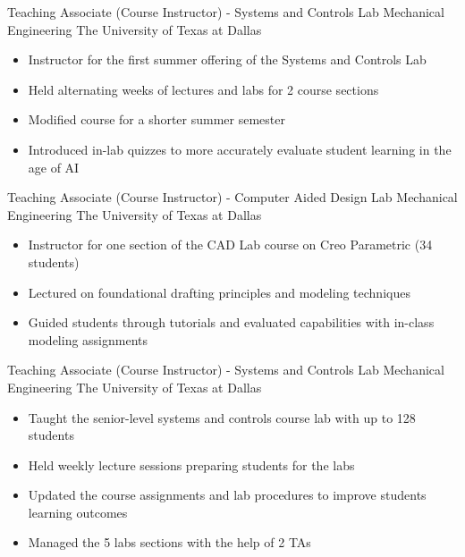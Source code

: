 \documentclass[11pt,letterpaper,roman]{moderncv} %
\begin{document}
{Teaching Associate (Course Instructor) - Systems and Controls Lab}
{Mechanical Engineering}
{The University of Texas at Dallas}{}
{\begin{itemize}
    \item Instructor for the first summer offering of the Systems and Controls Lab
    \item Held alternating weeks of lectures and labs for 2 course sections
    \item Modified course for a shorter summer semester 
    \item Introduced in-lab quizzes to more accurately evaluate student learning in the age of AI
\end{itemize}}

{Teaching Associate (Course Instructor) - Computer Aided Design Lab}
{Mechanical Engineering}
{The University of Texas at Dallas}{}
{\begin{itemize}
    \item Instructor for one section of the CAD Lab course on Creo Parametric (34 students)
    \item Lectured on foundational drafting principles and modeling techniques
    \item Guided students through tutorials and evaluated capabilities with in-class modeling assignments
\end{itemize}}

{Teaching Associate (Course Instructor) - Systems and Controls Lab}
{Mechanical Engineering}
{The University of Texas at Dallas}{}
{\begin{itemize}
    \item Taught the senior-level systems and controls course lab with up to 128 students
    \item Held weekly lecture sessions preparing students for the labs
    \item Updated the course assignments and lab procedures to improve students learning outcomes
    \item Managed the 5 labs sections with the help of 2 TAs
\end{itemize}}

\end{document}
